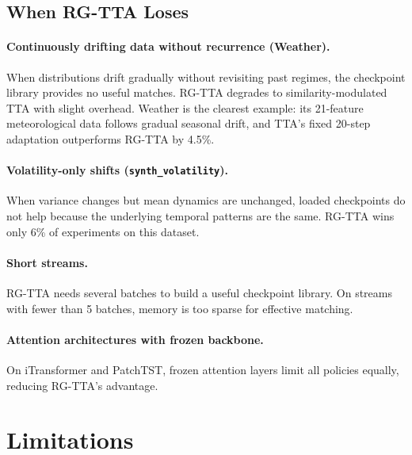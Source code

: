 \documentclass[journal]{IEEEtran}
\begin{document}
\subsection{When RG-TTA Loses}

\paragraph{Continuously drifting data without recurrence (Weather).} When distributions drift gradually without revisiting past regimes, the checkpoint library provides no useful matches. RG-TTA degrades to similarity-modulated TTA with slight overhead. Weather is the clearest example: its 21-feature meteorological data follows gradual seasonal drift, and TTA's fixed 20-step adaptation outperforms RG-TTA by 4.5\%.

\paragraph{Volatility-only shifts (\texttt{synth\_volatility}).} When variance changes but mean dynamics are unchanged, loaded checkpoints do not help because the underlying temporal patterns are the same. RG-TTA wins only 6\% of experiments on this dataset.

\paragraph{Short streams.} RG-TTA needs several batches to build a useful checkpoint library. On streams with fewer than 5 batches, memory is too sparse for effective matching.

\paragraph{Attention architectures with frozen backbone.} On iTransformer and PatchTST, frozen attention layers limit all policies equally, reducing RG-TTA's advantage.


\section{Limitations}
\label{sec:limitations}
\end{document}
